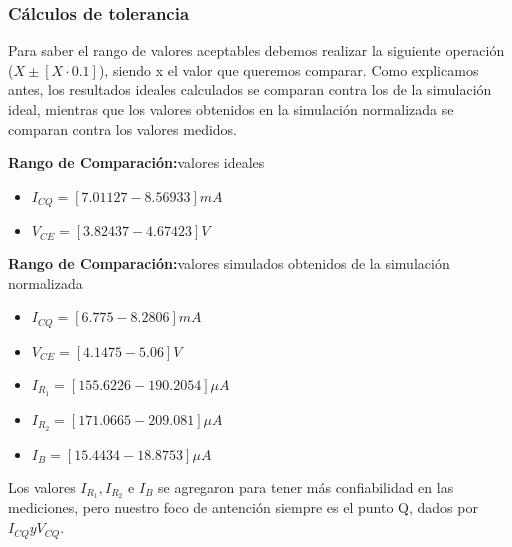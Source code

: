 \begin{multicols}{2}



				\subsubsection{Cálculos de tolerancia}
				\sangria{}Para saber el rango de valores aceptables debemos realizar la siguiente operación ($X \pm [X \cdot 0.1] $), siendo x el valor que queremos comparar.
				Como explicamos antes, los resultados ideales calculados se comparan contra los de la simulación ideal, mientras que los valores obtenidos en la simulación normalizada se comparan contra los valores medidos.

				\textbf{Rango de Comparación:}valores ideales
				\begin{itemize}
					\item $I_{CQ}=[7.01127 - 8.56933]mA$
					\item $V_{CE}=[3.82437 - 4.67423]V$
				\end{itemize}

				\textbf{Rango de Comparación:}valores simulados obtenidos de la simulación normalizada
				\begin{itemize}
					\item $I_{CQ}=[6.775 - 8.2806]mA$
					\item $V_{CE}=[4.1475 - 5.06]V$
					\item $I_{R_1}=[155.6226 - 190.2054]\mu A$
					\item $I_{R_2}=[171.0665 - 209.081]\mu A$
					\item $I_{B}=[15.4434 - 18.8753]\mu A$
				\end{itemize}
				\sangria{} Los valores $I_{R_1}, I_{R_2}$ e $ I_{B}$ se agregaron para tener más confiabilidad en las mediciones, pero nuestro foco de antención siempre es el punto Q, dados por $I_{CQ} y V_{CQ}$.


\end{multicols}
